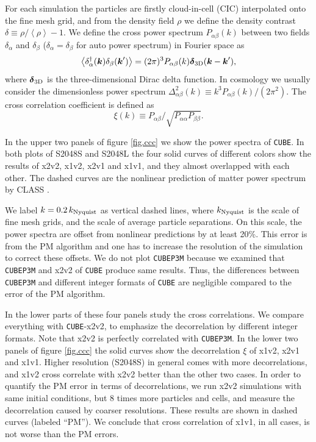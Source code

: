\documentclass[10pt,twocolumn,preprint]{emulateapj}
\newcommand{\bs}{\boldsymbol}
\begin{document}
For each simulation the particles are firstly cloud-in-cell (CIC) interpolated onto the fine mesh grid, and from the density field $\rho$ we define the density contrast $\delta\equiv \rho/\left\langle \rho \right\rangle-1$. We define the cross power spectrum $P_{\alpha\beta}(k)$ between two fields $\delta_\alpha$ and $\delta_\beta$ ($\delta_\alpha=\delta_\beta$ for auto power spectrum) in Fourier space as
\begin{equation}\label{eq.cps}
	\left\langle \delta_\alpha^\dagger({\bs k})\delta_\beta({\bs k}') \right\rangle=
    (2\pi)^3 P_{\alpha\beta}(k){\bs \delta}_{\rm 3D}({\bs k}-{\bs k}'),
\end{equation}
where ${\bs \delta}_{\rm 3D}$ is the three-dimensional Dirac delta function. In cosmology we usually consider the dimensionless power spectrum $\Delta^2_{\alpha\beta}(k)\equiv k^3 P_{\alpha\beta}(k)/(2\pi^2)$. The cross correlation coefficient is defined as
\begin{equation}\label{eq.ccc}
	\xi(k)\equiv P_{\alpha\beta}/\sqrt{P_{\alpha\alpha}P_{\beta\beta}}.
\end{equation}

In the upper two panels of figure \ref{fig.ccc} we show the power spectra of {\tt CUBE}. In both plots of S2048S and S2048L the four solid curves of different colors show the results of x2v2, x1v2, x2v1 and x1v1, and they almost overlapped with each other. The dashed curves are the nonlinear prediction of matter power spectrum by CLASS \citep{2011JCAP...07..034B}.

We label $k=0.2\,k_{\rm Nyquist}$ as vertical dashed lines, where $k_{\rm Nyquist}$ is the scale of fine mesh grids, and the scale of average particle separations. On this scale, the power spectra are offset from nonlinear predictions by at least 20\%. This error is from the PM algorithm and one has to increase the resolution of the simulation to correct these offsets. We do not plot {\tt CUBEP3M} because we examined that {\tt CUBEP3M} and x2v2 of {\tt CUBE} produce same results. Thus, the differences between {\tt CUBEP3M} and different integer formats of {\tt CUBE} are negligible compared to the error of the PM algorithm.

In the lower parts of these four panels study the cross correlations. We compare everything with {\tt CUBE}-x2v2, to emphasize the decorrelation by different integer formats. Note that x2v2 is perfectly correlated with {\tt CUBEP3M}. In the lower two panels of figure \ref{fig.ccc} the solid curves show the decorrelation $\xi$ of x1v2, x2v1 and x1v1. Higher resolution (S2048S) in general comes with more decorrelations, and x1v2 cross correlate with x2v2 better than the other two cases. In order to quantify the PM error in terms of decorrelations, we run x2v2 simulations with same initial conditions, but 8 times more particles and cells, and measure the decorrelation caused by coarser resolutions. These results are shown in dashed curves (labeled ``PM''). We conclude that cross correlation of x1v1, in all cases, is not worse than the PM errors.
\end{document}
